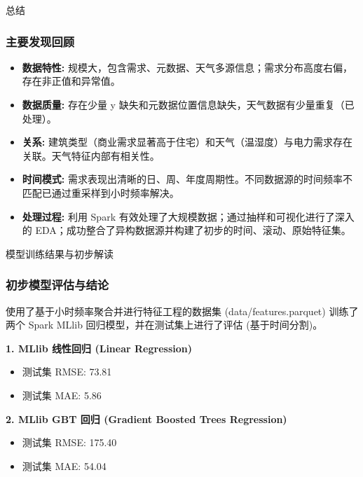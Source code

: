 \documentclass{beamer} %
\begin{document}
\begin{frame}{总结}
    \frametitle{主要发现回顾}
    \begin{itemize}
        \item \textbf{数据特性:} 规模大，包含需求、元数据、天气多源信息；需求分布高度右偏，存在非正值和异常值。
        \item \textbf{数据质量:} 存在少量 y 缺失和元数据位置信息缺失，天气数据有少量重复（已处理）。
        \item \textbf{关系:} 建筑类型（商业需求显著高于住宅）和天气（温湿度）与电力需求存在关联。天气特征内部有相关性。
        \item \textbf{时间模式:} 需求表现出清晰的日、周、年度周期性。不同数据源的时间频率不匹配已通过重采样到小时频率解决。
        \item \textbf{处理过程:} 利用 Spark 有效处理了大规模数据；通过抽样和可视化进行了深入的 EDA；成功整合了异构数据源并构建了初步的时间、滚动、原始特征集。
    \end{itemize}
\end{frame}

\begin{frame}{模型训练结果与初步解读}
    \frametitle{初步模型评估与结论}
    使用了基于小时频率聚合并进行特征工程的数据集 (data/features.parquet) 训练了两个 Spark MLlib 回归模型，并在测试集上进行了评估 (基于时间分割)。

    \textbf{1. MLlib 线性回归 (Linear Regression)}
    \begin{itemize}
        \item 测试集 RMSE: 73.81
        \item 测试集 MAE: 5.86
    \end{itemize}

    \textbf{2. MLlib GBT 回归 (Gradient Boosted Trees Regression)}
    \begin{itemize}
        \item 测试集 RMSE: 175.40
        \item 测试集 MAE: 54.04
    \end{itemize}
\end{frame}
\end{document}
